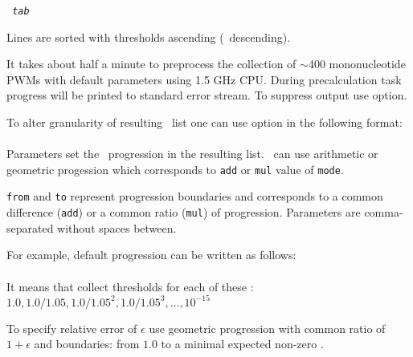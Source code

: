 \texttt{ \textit{tab} }

Lines are sorted with thresholds ascending (\pvalue\ descending).

It takes about half a minute to preprocess the collection of $\sim$400 mononucleotide PWMs with default
parameters using 1.5 GHz CPU. During precalculation task progress will be printed to standard error stream. To suppress output use  option.

To alter granularity of resulting \pvalues\ list one can use  option in the following format:\\
\\

Parameters set the \pvalues\ progression in the resulting list. \pvalues\ can use arithmetic or geometric progession which corresponds to \texttt{add} or \texttt{mul} value of \texttt{mode}.

\texttt{from} and \texttt{to} represent progression boundaries and  corresponds to a common difference (\texttt{add}) or a common ratio (\texttt{mul}) of progression. Parameters are comma-separated without spaces between.

For example, default progression can be written as follows:\\
\\

It means that  collect thresholds for
each of these \pvalues: $1.0, 1.0/1.05, 1.0/1.05^2, 1.0/1.05^3,\ldots,
10^{-15}$

To specify relative error of $\epsilon$ use geometric progression with common ratio of $1+\epsilon$ and boundaries: from $1.0$ to a minimal expected non-zero \pvalue.
